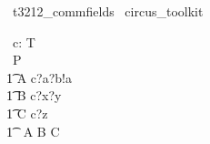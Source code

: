 
\begin{zsection}
  \SECTION\ t3212\_commfields \parents\ circus\_toolkit
\end{zsection}

\begin{zed}
   [T]
\end{zed}

\begin{circus}
    \circchannel\ c: \nat \cross T \cross \nat   \\ 
    \circprocess\ P \circdef \circbegin \\
        \t1 A \circdef c?a?b!a \then \Skip \\
	\t1 B \circdef c?x?y \then \Skip \\
	\t1 C \circdef c?z \then \Skip \\
    	\t1 \circspot\ A \circseq B \circseq C 
    \circend \\
\end{circus}


